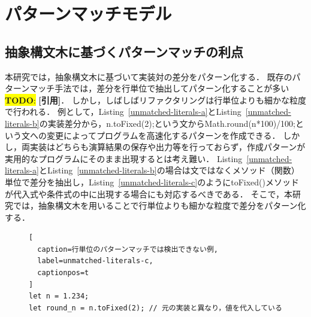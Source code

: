 \documentclass[11pt]{jreport}
\newcommand{\todo}[1]{\colorbox{yellow}{{\bf TODO}:}{\color{red} {\textbf{[#1]}}}}
\begin{document}


\section{パターンマッチモデル}




\subsection{抽象構文木に基づくパターンマッチの利点}


本研究では，抽象構文木に基づいて実装対の差分をパターン化する．
既存のパターンマッチ手法では，差分を行単位で抽出してパターン化することが多い\todo{引用}．
しかし，しばしばリファクタリングは行単位よりも細かな粒度で行われる．
例として，Listing~\ref{unmatched-literals-a}とListing~\ref{unmatched-literals-b}の実装差分から，n.toFixed(2);という文からMath.round(n*100)/100;という文への変更によってプログラムを高速化するパターンを作成できる．
しかし，両実装はどちらも演算結果の保存や出力等を行っておらず，作成パターンが実用的なプログラムにそのまま出現するとは考え難い．
Listing~\ref{unmatched-literals-a}とListing~\ref{unmatched-literals-b}の場合は文ではなくメソッド（関数）単位で差分を抽出し，Listing~\ref{unmatched-literals-c}のようにtoFixed()メソッドが代入式や条件式の中に出現する場合にも対応するべきである．
そこで，本研究では，抽象構文木を用いることで行単位よりも細かな粒度で差分をパターン化する．


\begin{figure}[t]
\captionsetup{name=Listing}
\hspace{0.04\columnwidth}
\begin{minipage}[b]{0.96\linewidth}
\begin{lstlisting}[
  caption=行単位のパターンマッチでは検出できない例,
  label=unmatched-literals-c,
  captionpos=t
]
let n = 1.234;
let round_n = n.toFixed(2); // 元の実装と異なり，値を代入している
\end{lstlisting}
\end{minipage}
\end{figure}



\end{document}
